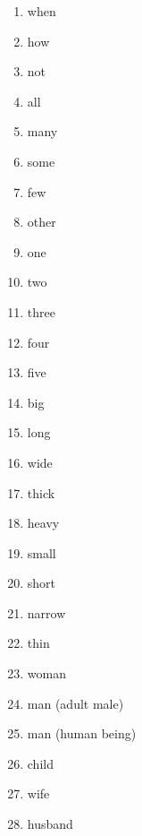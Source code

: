 \begin{multicols}{2}
\begin{enumerate}
\item   when 

\item   how 

\item   not 

\item   all 

\item   many 

\item   some 

\item   few 

\item   other 

\item   one 

\item   two 

\item   three 

\item   four 

\item   five 

\item   big 

\item   long 

\item   wide 

\item   thick 

\item   heavy 

\item   small 

\item   short 

\item   narrow 

\item   thin 

\item   woman 

\item   man (adult male) 

\item   man (human being) 

\item   child 

\item   wife 

\item   husband 


\end{enumerate}
\end{multicols}
